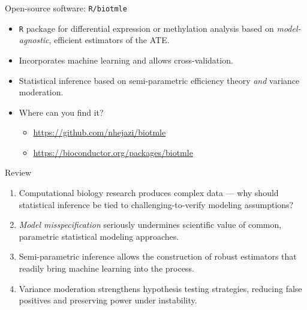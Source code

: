 \documentclass{beamer}
\begin{document}
\begin{frame}[c]{Open-source software: \texttt{R/biotmle}}

\begin{center}
\begin{itemize}
  \itemsep6pt
  \item \texttt{R} package for differential expression or methylation analysis
     based on \textit{model-agnostic}, efficient estimators of the ATE.
  \item Incorporates machine learning and allows cross-validation.
  \item Statistical inference based on semi-parametric efficiency theory
    \textit{and} variance moderation.
  \item Where can you find it?
    \begin{itemize}
      \itemsep4pt
      \item \url{https://github.com/nhejazi/biotmle}
      \item \url{https://bioconductor.org/packages/biotmle}
    \end{itemize}
\end{itemize}
\end{center}

\end{frame}


\begin{frame}[c]{Review}
\begin{center}
\begin{enumerate}
  \itemsep6pt
  \item Computational biology research produces complex data ---
    why should statistical inference be tied to challenging-to-verify modeling
    assumptions?
  \item \textit{Model misspecification} seriously undermines scientific
    value of common, parametric statistical modeling approaches.
  \item Semi-parametric inference allows the construction of robust estimators
    that readily bring machine learning into the process.
  \item Variance moderation strengthens hypothesis testing strategies, reducing
    false positives and preserving power under instability.
\end{enumerate}
\end{center}


\end{frame}
\end{document}

